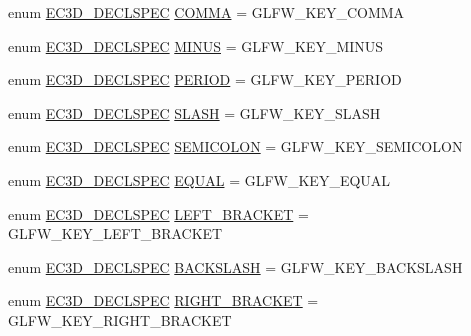 \begin{DoxyCompactItemize}
enum \mbox{\hyperlink{_common_8h_aac42573e202ca3dd4d259c81691e2369}{E\+C3\+D\+\_\+\+D\+E\+C\+L\+S\+P\+EC}} \mbox{\hyperlink{classec_1_1_keyboard_aa40289b5c2768f80103cd5cbd89f3158}{C\+O\+M\+MA}} = G\+L\+F\+W\+\_\+\+K\+E\+Y\+\_\+\+C\+O\+M\+MA
\item 
enum \mbox{\hyperlink{_common_8h_aac42573e202ca3dd4d259c81691e2369}{E\+C3\+D\+\_\+\+D\+E\+C\+L\+S\+P\+EC}} \mbox{\hyperlink{classec_1_1_keyboard_a3891ae964cb95fefde0f6368378062ce}{M\+I\+N\+US}} = G\+L\+F\+W\+\_\+\+K\+E\+Y\+\_\+\+M\+I\+N\+US
\item 
enum \mbox{\hyperlink{_common_8h_aac42573e202ca3dd4d259c81691e2369}{E\+C3\+D\+\_\+\+D\+E\+C\+L\+S\+P\+EC}} \mbox{\hyperlink{classec_1_1_keyboard_acf085f565c388ccf5b1054d9f1188e5c}{P\+E\+R\+I\+OD}} = G\+L\+F\+W\+\_\+\+K\+E\+Y\+\_\+\+P\+E\+R\+I\+OD
\item 
enum \mbox{\hyperlink{_common_8h_aac42573e202ca3dd4d259c81691e2369}{E\+C3\+D\+\_\+\+D\+E\+C\+L\+S\+P\+EC}} \mbox{\hyperlink{classec_1_1_keyboard_a747485c97864655c5736ad24058462ff}{S\+L\+A\+SH}} = G\+L\+F\+W\+\_\+\+K\+E\+Y\+\_\+\+S\+L\+A\+SH
\item 
enum \mbox{\hyperlink{_common_8h_aac42573e202ca3dd4d259c81691e2369}{E\+C3\+D\+\_\+\+D\+E\+C\+L\+S\+P\+EC}} \mbox{\hyperlink{classec_1_1_keyboard_a23a6eded3a92f7b3c28feffc94e968d3}{S\+E\+M\+I\+C\+O\+L\+ON}} = G\+L\+F\+W\+\_\+\+K\+E\+Y\+\_\+\+S\+E\+M\+I\+C\+O\+L\+ON
\item 
enum \mbox{\hyperlink{_common_8h_aac42573e202ca3dd4d259c81691e2369}{E\+C3\+D\+\_\+\+D\+E\+C\+L\+S\+P\+EC}} \mbox{\hyperlink{classec_1_1_keyboard_a051c2a49d048576c1b26eee68956d2f9}{E\+Q\+U\+AL}} = G\+L\+F\+W\+\_\+\+K\+E\+Y\+\_\+\+E\+Q\+U\+AL
\item 
enum \mbox{\hyperlink{_common_8h_aac42573e202ca3dd4d259c81691e2369}{E\+C3\+D\+\_\+\+D\+E\+C\+L\+S\+P\+EC}} \mbox{\hyperlink{classec_1_1_keyboard_a1061a62f40664df678f7f623c75acac8}{L\+E\+F\+T\+\_\+\+B\+R\+A\+C\+K\+ET}} = G\+L\+F\+W\+\_\+\+K\+E\+Y\+\_\+\+L\+E\+F\+T\+\_\+\+B\+R\+A\+C\+K\+ET
\item 
enum \mbox{\hyperlink{_common_8h_aac42573e202ca3dd4d259c81691e2369}{E\+C3\+D\+\_\+\+D\+E\+C\+L\+S\+P\+EC}} \mbox{\hyperlink{classec_1_1_keyboard_ac95f092533e5488828bce92e852566e8}{B\+A\+C\+K\+S\+L\+A\+SH}} = G\+L\+F\+W\+\_\+\+K\+E\+Y\+\_\+\+B\+A\+C\+K\+S\+L\+A\+SH
\item 
enum \mbox{\hyperlink{_common_8h_aac42573e202ca3dd4d259c81691e2369}{E\+C3\+D\+\_\+\+D\+E\+C\+L\+S\+P\+EC}} \mbox{\hyperlink{classec_1_1_keyboard_af2a488f997bea31744e18b8cf4bad42e}{R\+I\+G\+H\+T\+\_\+\+B\+R\+A\+C\+K\+ET}} = G\+L\+F\+W\+\_\+\+K\+E\+Y\+\_\+\+R\+I\+G\+H\+T\+\_\+\+B\+R\+A\+C\+K\+ET

\end{DoxyCompactItemize}
